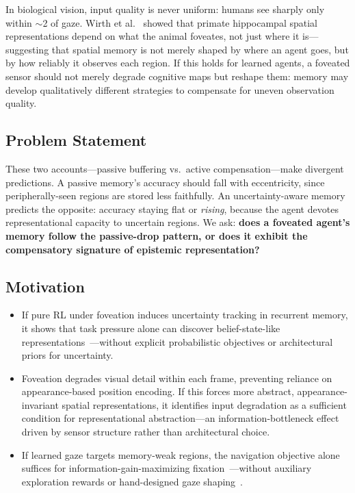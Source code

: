 \documentclass[10pt,conference,compsocconf]{IEEEtran}
\begin{document}
In biological vision, input quality is never uniform: humans see sharply only within $\sim$2\textdegree{} of gaze. Wirth et al.~\cite{wirth2017gaze} showed that primate hippocampal spatial representations depend on what the animal foveates, not just where it is---suggesting that spatial memory is not merely shaped by where an agent goes, but by how reliably it observes each region. If this holds for learned agents, a foveated sensor should not merely degrade cognitive maps but reshape them: memory may develop qualitatively different strategies to compensate for uneven observation quality.

\subsection{Problem Statement}

These two accounts---passive buffering vs.\ active compensation---make divergent predictions. A passive memory's accuracy should fall with eccentricity, since peripherally-seen regions are stored less faithfully. An uncertainty-aware memory predicts the opposite: accuracy staying flat or \emph{rising}, because the agent devotes representational capacity to uncertain regions. We ask: \textbf{does a foveated agent's memory follow the passive-drop pattern, or does it exhibit the compensatory signature of epistemic representation?}

\subsection{Motivation}

\begin{itemize}
    \item If pure RL under foveation induces uncertainty tracking in recurrent memory, it shows that task pressure alone can discover belief-state-like representations~\cite{hennig2023belief}---without explicit probabilistic objectives or architectural priors for uncertainty.
    \item Foveation degrades visual detail within each frame, preventing reliance on appearance-based position encoding. If this forces more abstract, appearance-invariant spatial representations, it identifies input degradation as a sufficient condition for representational abstraction---an information-bottleneck effect driven by sensor structure rather than architectural choice.
    \item If learned gaze targets memory-weak regions, the navigation objective alone suffices for information-gain-maximizing fixation~\cite{radulescu2022eyemovements}---without auxiliary exploration rewards or hand-designed gaze shaping~\cite{shang2023sugarl}.
\end{itemize}
\end{document}
